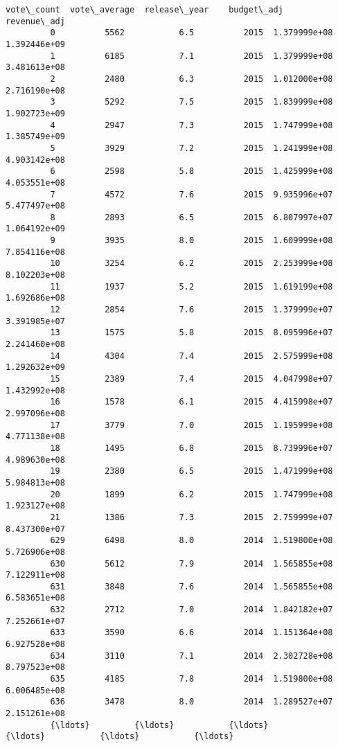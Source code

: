 \documentclass[11pt]{article}
\begin{document}
\begin{Verbatim}[commandchars=\\\{\}]
              vote\_count  vote\_average  release\_year    budget\_adj   revenue\_adj  
         0          5562           6.5          2015  1.379999e+08  1.392446e+09  
         1          6185           7.1          2015  1.379999e+08  3.481613e+08  
         2          2480           6.3          2015  1.012000e+08  2.716190e+08  
         3          5292           7.5          2015  1.839999e+08  1.902723e+09  
         4          2947           7.3          2015  1.747999e+08  1.385749e+09  
         5          3929           7.2          2015  1.241999e+08  4.903142e+08  
         6          2598           5.8          2015  1.425999e+08  4.053551e+08  
         7          4572           7.6          2015  9.935996e+07  5.477497e+08  
         8          2893           6.5          2015  6.807997e+07  1.064192e+09  
         9          3935           8.0          2015  1.609999e+08  7.854116e+08  
         10         3254           6.2          2015  2.253999e+08  8.102203e+08  
         11         1937           5.2          2015  1.619199e+08  1.692686e+08  
         12         2854           7.6          2015  1.379999e+07  3.391985e+07  
         13         1575           5.8          2015  8.095996e+07  2.241460e+08  
         14         4304           7.4          2015  2.575999e+08  1.292632e+09  
         15         2389           7.4          2015  4.047998e+07  1.432992e+08  
         16         1578           6.1          2015  4.415998e+07  2.997096e+08  
         17         3779           7.0          2015  1.195999e+08  4.771138e+08  
         18         1495           6.8          2015  8.739996e+07  4.989630e+08  
         19         2380           6.5          2015  1.471999e+08  5.984813e+08  
         20         1899           6.2          2015  1.747999e+08  1.923127e+08  
         21         1386           7.3          2015  2.759999e+07  8.437300e+07  
         629        6498           8.0          2014  1.519800e+08  5.726906e+08  
         630        5612           7.9          2014  1.565855e+08  7.122911e+08  
         631        3848           7.6          2014  1.565855e+08  6.583651e+08  
         632        2712           7.0          2014  1.842182e+07  7.252661e+07  
         633        3590           6.6          2014  1.151364e+08  6.927528e+08  
         634        3110           7.1          2014  2.302728e+08  8.797523e+08  
         635        4185           7.8          2014  1.519800e+08  6.006485e+08  
         636        3478           8.0          2014  1.289527e+07  2.151261e+08  
         {\ldots}         {\ldots}           {\ldots}           {\ldots}           {\ldots}           {\ldots}  

\end{Verbatim}
\end{document}

